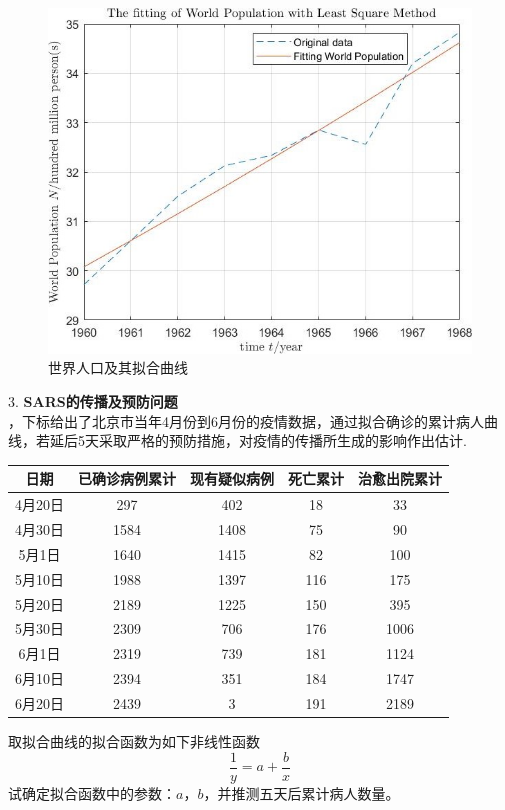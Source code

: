 \documentclass[10pt,a4paper]{article}
\begin{document}
\begin{figure}[H]
\centering
\includegraphics[scale=.5]{2.jpg}
\caption{世界人口及其拟合曲线}
\end{figure}

3. \textbf{SARS的传播及预防问题}\\
，下标给出了北京市当年4月份到6月份的疫情数据，通过拟合确诊的累计病人曲线，若延后5天采取严格的预防措施，对疫情的传播所生成的影响作出估计.
\begin{table}[h]
\begin{tabular}{|c|c|c|c|c|}
\hline
日期    & 已确诊病例累计 & 现有疑似病例 & 死亡累计 & 治愈出院累计 \\ \hline
4月20日 & 297     & 402    & 18   & 33     \\ \hline
4月30日 & 1584    & 1408   & 75   & 90     \\ \hline
5月1日  & 1640    & 1415   & 82   & 100    \\ \hline
5月10日 & 1988    & 1397   & 116  & 175    \\ \hline
5月20日 & 2189    & 1225   & 150  & 395    \\ \hline
5月30日 & 2309    & 706    & 176  & 1006   \\ \hline
6月1日  & 2319    & 739    & 181  & 1124   \\ \hline
6月10日 & 2394    & 351    & 184  & 1747   \\ \hline
6月20日 & 2439    & 3      & 191  & 2189   \\ \hline
\end{tabular}
\end{table}
\newpage
取拟合曲线的拟合函数为如下非线性函数
\[
\frac{1}{y}=a+\frac{b}{x}
\]
试确定拟合函数中的参数：$a$，$b$，并推测五天后累计病人数量。
\end{document}
